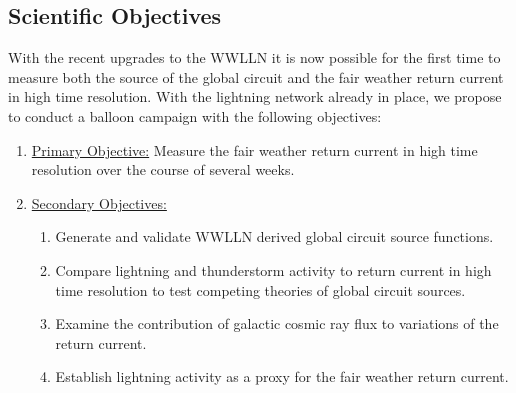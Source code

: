 %
%
%
%
%
%
%
%
%


\subsection*{Scientific Objectives}

With the recent upgrades to the WWLLN it is now possible for the first time to measure both the source of the global circuit and the fair weather return current in high time resolution.
With the lightning network already in place, we propose to conduct a balloon campaign with the following objectives:

\begin{enumerate}
\item{\underline{Primary Objective:} Measure the fair weather return current in high time resolution over the course of several weeks.}
\item{\underline{Secondary Objectives:}
\begin{enumerate}
\item{Generate and validate WWLLN derived global circuit source functions.}
\item{Compare lightning and thunderstorm activity to return current in high time resolution to test competing theories of global circuit sources.}
\item{Examine the contribution of galactic cosmic ray flux to variations of the return current.}
\item{Establish lightning activity as a proxy for the fair weather return current.}
\end{enumerate}}
\end{enumerate}

